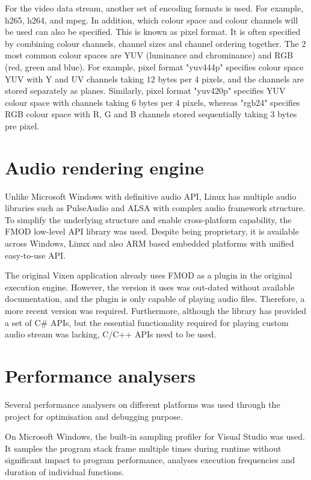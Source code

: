 For the video data stream, another set of encoding formats is used. For example, h265, h264, and mpeg. In addition, which colour space and colour channels will be used can also be specified. This is known as pixel format. It is often specified by combining colour channels, channel sizes and channel ordering together. The 2 most common colour spaces are YUV (luminance and chrominance) and RGB (red, green and blue). For example, pixel format "yuv444p" specifies colour space YUV with Y and UV channels taking 12 bytes per 4 pixels, and the channels are stored separately as planes. Similarly, pixel format "yuv420p" specifies YUV colour space with channels taking 6 bytes per 4 pixels, whereas "rgb24" specifies RGB colour space with R, G and B channels stored sequentially taking 3 bytes pre pixel.

\section{Audio rendering engine}

Unlike Microsoft Windows with definitive audio API, Linux has multiple audio libraries such as PulseAudio \cite{developers2013pulseaudio} and ALSA \cite{alsa} with complex audio framework structure. To simplify the underlying structure and enable cross-platform capability, the FMOD \cite{fmod} low-level API library was used. Despite being proprietary, it is available across Windows, Linux and also ARM based embedded platforms with unified easy-to-use API.

The original Vixen application already uses FMOD as a plugin in the original execution engine. However, the version it uses was out-dated without available documentation, and the plugin is only capable of playing audio files. Therefore, a more recent version was required. Furthermore, although the library has provided a set of C\# APIs, but the essential functionality required for playing custom audio stream was lacking, C/C++ APIs need to be used.

\section{Performance analysers}

Several performance analysers on different platforms was used through the project for optimisation and debugging purpose.

On Microsoft Windows, the built-in sampling profiler for Visual Studio was used. It samples the program stack frame multiple times during runtime without significant impact to program performance, analyses execution frequencies and duration of individual functions.

